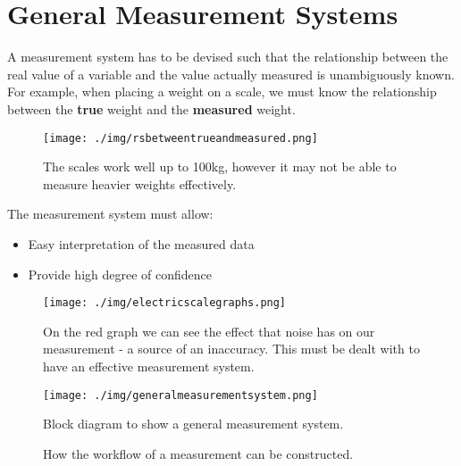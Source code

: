 \chapter{General Measurement Systems}
A measurement system has to be devised such that the relationship between the real value of a variable and the value actually measured is unambiguously known. For example, when placing a weight on a scale, we must know the relationship between the \textbf{true} weight and the \textbf{measured} weight.
\begin{figure}
  \centering
  \texttt{[image: ./img/rsbetweentrueandmeasured.png]}
  \caption{The scales work well up to 100kg, however it may not be able to measure heavier weights effectively.}
\end{figure}
The measurement system must allow:
\begin{itemize}
  \item Easy interpretation of the measured data
  \item Provide high degree of confidence
\end{itemize}
\begin{figure}
  \centering
  \texttt{[image: ./img/electricscalegraphs.png]}
  \caption{On the red graph we can see the effect that noise has on our measurement - a source of an inaccuracy. This must be dealt with to have an effective measurement system.}
\end{figure}
\begin{figure}
  \centering
  \texttt{[image: ./img/generalmeasurementsystem.png]}
  \caption{Block diagram to show a general measurement system.}
\end{figure}

\begin{figure}
  \centering
  \caption{How the workflow of a measurement can be constructed.}
\end{figure}
